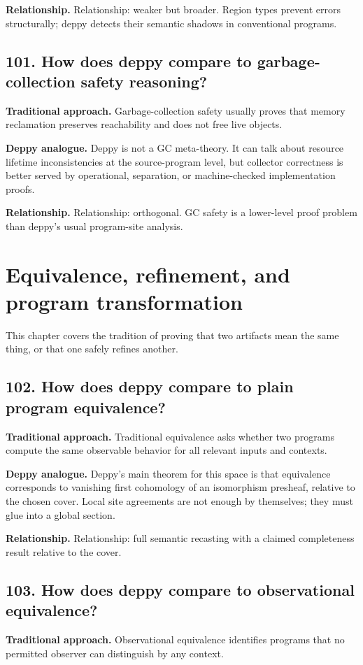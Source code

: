 \documentclass[11pt,openany]{book}
\begin{document}
\textbf{Relationship.} Relationship: weaker but broader. Region types prevent errors structurally; deppy detects their semantic shadows in conventional programs.

\section*{101. How does deppy compare to garbage-collection safety reasoning?}
\textbf{Traditional approach.} Garbage-collection safety usually proves that memory reclamation preserves reachability and does not free live objects.

\textbf{Deppy analogue.} Deppy is not a GC meta-theory. It can talk about resource lifetime inconsistencies at the source-program level, but collector correctness is better served by operational, separation, or machine-checked implementation proofs.

\textbf{Relationship.} Relationship: orthogonal. GC safety is a lower-level proof problem than deppy's usual program-site analysis.

\chapter{Equivalence, refinement, and program transformation}
This chapter covers the tradition of proving that two artifacts mean the same thing, or that one safely refines another.

\section*{102. How does deppy compare to plain program equivalence?}
\textbf{Traditional approach.} Traditional equivalence asks whether two programs compute the same observable behavior for all relevant inputs and contexts.

\textbf{Deppy analogue.} Deppy's main theorem for this space is that equivalence corresponds to vanishing first cohomology of an isomorphism presheaf, relative to the chosen cover. Local site agreements are not enough by themselves; they must glue into a global section.

\textbf{Relationship.} Relationship: full semantic recasting with a claimed completeness result relative to the cover.

\section*{103. How does deppy compare to observational equivalence?}
\textbf{Traditional approach.} Observational equivalence identifies programs that no permitted observer can distinguish by any context.
\end{document}
